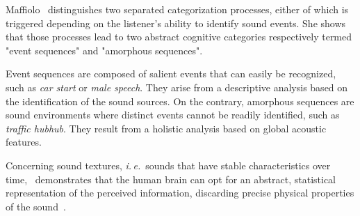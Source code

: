 \documentclass[12pt]{elsarticle}
\newcommand{\ie}{\emph{i.\,e.}}
\begin{document}
Maffiolo~\cite{maffiolo_caracterisation_1999} distinguishes two separated categorization processes, either of which is triggered depending on the listener's ability to identify sound events. She shows that those processes lead to two abstract cognitive categories respectively termed "event sequences" and "amorphous sequences".


Event sequences are composed of salient events that can easily be recognized, such as \emph{car start} or \emph{male speech}. They arise from a descriptive analysis based on the identification of the sound sources. On the contrary, amorphous sequences are sound environments where distinct events cannot be readily identified, such as \emph{traffic hubhub}. They result from a holistic analysis based on global acoustic features.


Concerning sound textures, \ie~sounds that have stable characteristics over time,~\cite{mcdermott2011sound,mcdermott2013summary} demonstrates that the human brain can opt for an abstract, statistical representation of the perceived information, discarding precise physical properties of the sound~\cite{nelken2013ear}.

\end{document}

